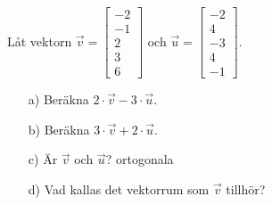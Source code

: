 Låt vektorn $\vec{v}=\begin{bmatrix}-2 \\ -1 \\ 2 \\ 3 \\ 6 \end{bmatrix}$ och $\vec{u}=\begin{bmatrix}-2 \\ 4 \\ -3 \\ 4 \\ -1 \end{bmatrix}$.
\begin{itemize}
\item[a) ] Beräkna $2\cdot\vec{v}-3\cdot\vec{u}$.
\item[b) ] Beräkna $3\cdot\vec{v}+2\cdot\vec{u}$.
\item[c) ] Är $\vec{v}$ och $\vec{u}$? ortogonala
\item[d) ] Vad kallas det vektorrum som $\vec{v}$ tillhör? 
\end{itemize}
